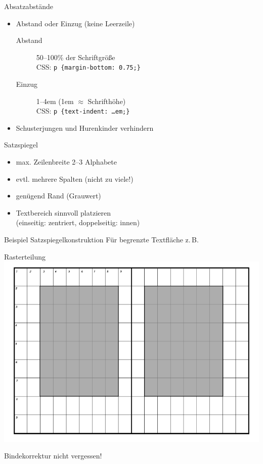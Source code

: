 \documentclass[ngerman,draft, usepdftitle=true]{beamer}
\newcommand*{\code}[1]{\texttt{#1}}
\begin{document}
\begin{frame}{Absatzabstände}
  \begin{itemize}
  \item<1-> Abstand \alert{oder} Einzug (\alert{keine} Leerzeile)
    \begin{description}
    \item[Abstand] 50–100\% der Schriftgröße\\
      CSS: \code{p \{margin-bottom: 0.75;\}}
    \item[Einzug] 1–4em (1em $\approx$ Schrifthöhe)\\
      CSS: \code{p \{text-indent: …em;\}} 
    \end{description}
  \item<2-> Schusterjungen und Hurenkinder verhindern
  \end{itemize}
\end{frame}

\begin{frame}{Satzspiegel}
  \begin{itemize}
  \item max. Zeilenbreite 2–3 Alphabete 
  \item evtl. mehrere Spalten (nicht zu viele!)
  \item genügend Rand (Grauwert)
  \item Textbereich sinnvoll platzieren\\
    (einseitig: zentriert, doppelseitig: innen)
  \end{itemize}
\end{frame}

\begin{frame}{Beispiel Satzspiegelkonstruktion}
  Für begrenzte Textfläche z.\,B.
  \begin{block}{Rasterteilung}
    \centering
    \includegraphics[height=.6\textheight]{Satzspiegel-Rasterteilung.png}
  \end{block}
  Bindekorrektur nicht vergessen!
\end{frame}
\end{document}
